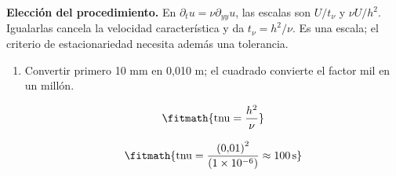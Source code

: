 \noindent\textbf{Elección del procedimiento.} En $\partial_tu=\nu\partial_{yy}u$, las escalas son $U/t_\nu$ y $\nu U/h^2$. Igualarlas cancela la velocidad característica y da $t_\nu=h^2/\nu$. Es una escala; el criterio de estacionariedad necesita además una tolerancia.

\begin{enumerate}

\item Convertir primero 10 mm en 0,010 m; el cuadrado convierte el factor mil en un millón.

\[\fitmath{\mathrm{tnu}=\frac{{h}^{2}}{\nu}}\]

\[\fitmath{\mathrm{tnu}=\frac{{(0{,}01)}^{2}}{(1\times10^{-6})}\approx 100\,\mathrm{s}}\]

\end{enumerate}

